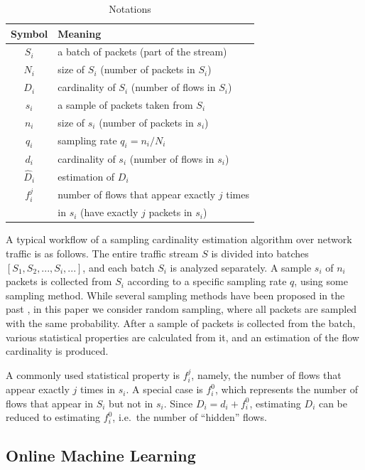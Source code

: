 		\begin{table}
			\centering
			\begin{tabular}{|c|l|} \hline
				\textbf{Symbol} & \textbf{Meaning}  \\\hline
				$S_i$ & a batch of packets (part of the stream)  \\\hline
				$N_i$ & size of $S_i$ (number of packets in $S_i$)\\\hline
				$D_i$ & cardinality of $S_i$ (number of flows in $S_i$)\\\hline
				$s_i$ & a sample of packets taken from $S_i$ \\\hline
				$n_i$ & size of $s_i$ (number of packets in $s_i$) \\\hline
				$q_i$ & sampling rate $q_i = n_i/N_i$ \\\hline
				$d_i$ & cardinality of $s_i$ (number of flows in $s_i$)\\\hline
				$\hat{D}_i$ & estimation of $D_i$ \\\hline
				$f_i^j$ & number of flows that appear exactly $j$ times\\& in $s_i$ (have exactly $j$ packets in $s_i$) \\\hline
			\end{tabular}
			\caption{Notations} 
			\label{table:notations}
		\end{table}
		
		A typical workflow of a sampling cardinality estimation algorithm over network traffic is as follows. The entire traffic stream $S$ is divided into batches $[S_1, S_2, ..., S_i, ...]$, and each batch $S_i$ is analyzed separately. A sample $s_i$ of $n_i$ packets is collected from $S_i$ according to a specific sampling rate $q$, using some sampling method. While several sampling methods have been proposed in the past \cite{einziger2017constant}, in this paper we consider random sampling, where all packets are sampled with the same probability. After a sample of packets is collected from the batch, various statistical properties are calculated from it, and an estimation of the flow cardinality is produced. 
		
A commonly used statistical property is $f_i^j$,
namely, the number of flows that appear exactly $j$
times in $s_i$. A special case is $f_i^0$, which
represents the number of flows that appear in $S_i$
but not in $s_i$. Since $D_i=d_i+f_i^0$,  estimating
$D_i$ can be reduced to estimating $f_i^0$, i.e.\,
the number of ``hidden'' flows. 


	\subsection{Online Machine Learning}
	
